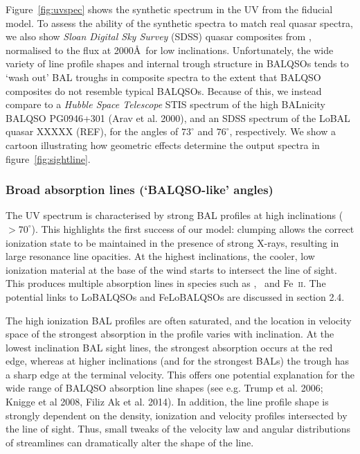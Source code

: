\documentclass[useAMS,usenatbib]{mn2e_x}
\begin{document}
\noindent
Figure~\ref{fig:uvspec} shows the synthetic spectrum in the UV from the fiducial model. 
To assess the ability of the synthetic spectra to match real 
quasar spectra, we also show {\sl Sloan Digital Sky Survey} (SDSS) quasar
composites from \cite{reichard2003}, normalised to the flux at 2000\AA\
for low inclinations. Unfortunately, the wide variety of
line profile shapes and internal trough structure in BALQSOs
tends to `wash out' BAL troughs in composite spectra
to the extent that BALQSO composites do not resemble typical BALQSOs.
Because of this, we instead compare to a {\sl Hubble Space Telescope} 
STIS spectrum of the high BALnicity BALQSO PG0946+301 (Arav et al. 2000),
and an SDSS spectrum of the LoBAL quasar XXXXX (REF),
for the angles of $73^\circ$ and $76^\circ$, respectively. 
We show a cartoon illustrating how geometric effects determine
the output spectra in figure~\ref{fig:sightline}.  

\subsubsection{Broad absorption lines (`BALQSO-like' angles)}

The UV spectrum is characterised by strong BAL 
profiles at high inclinations ($> 70^\circ$). 
This highlights the first success of our model: 
clumping allows the correct ionization state 
to be maintained in the presence of strong X-rays, 
resulting in large resonance line opacities. 
At the highest inclinations, the 
cooler, low ionization material at the base of the wind
starts to intersect the line of sight. This produces 
multiple absorption lines in species such as \mg,
\al\ and Fe~\textsc{ii}. The potential links to LoBALQSOs and 
FeLoBALQSOs are discussed in section 2.4.

The high ionization BAL profiles are often saturated, and the location in velocity space
of the strongest absorption in the profile varies with inclination.
At the lowest inclination BAL sight lines, the strongest absorption occurs at the red edge,
whereas at higher inclinations (and for the strongest BALs)
the trough has a sharp edge at the terminal velocity.
This offers one potential explanation for the wide range of BALQSO absorption
line shapes (see e.g. Trump et al. 2006; Knigge et al 2008, Filiz Ak et al. 2014).
In addition, the line profile shape is strongly dependent 
on the density, ionization and velocity 
profiles intersected by the line of sight. Thus, small tweaks of the velocity
law and angular distributions of streamlines can dramatically alter
the shape of the line.
\end{document}
